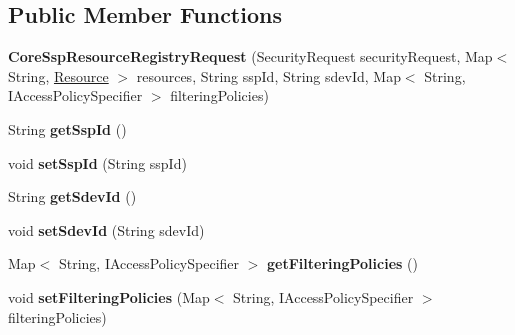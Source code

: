 \subsection*{Public Member Functions}
\begin{DoxyCompactItemize}
\item 
\mbox{\label{classeu_1_1h2020_1_1symbiote_1_1core_1_1internal_1_1CoreSspResourceRegistryRequest_a8bf3bce67d2ac86711298c947b2f7a15}} 
{\bfseries Core\+Ssp\+Resource\+Registry\+Request} (Security\+Request security\+Request, Map$<$ String, \hyperlink{classeu_1_1h2020_1_1symbiote_1_1model_1_1cim_1_1Resource}{Resource} $>$ resources, String ssp\+Id, String sdev\+Id, Map$<$ String, I\+Access\+Policy\+Specifier $>$ filtering\+Policies)
\item 
\mbox{\label{classeu_1_1h2020_1_1symbiote_1_1core_1_1internal_1_1CoreSspResourceRegistryRequest_a09b453f9836eddaf3b2746f798e9b730}} 
String {\bfseries get\+Ssp\+Id} ()
\item 
\mbox{\label{classeu_1_1h2020_1_1symbiote_1_1core_1_1internal_1_1CoreSspResourceRegistryRequest_a867bd2df3f9f47e5140006d5cdbb497e}} 
void {\bfseries set\+Ssp\+Id} (String ssp\+Id)
\item 
\mbox{\label{classeu_1_1h2020_1_1symbiote_1_1core_1_1internal_1_1CoreSspResourceRegistryRequest_a9fb925acbb24d1b4cdfd9c5508bc2549}} 
String {\bfseries get\+Sdev\+Id} ()
\item 
\mbox{\label{classeu_1_1h2020_1_1symbiote_1_1core_1_1internal_1_1CoreSspResourceRegistryRequest_aad9055660a26b8e451b41394d499e7e4}} 
void {\bfseries set\+Sdev\+Id} (String sdev\+Id)
\item 
\mbox{\label{classeu_1_1h2020_1_1symbiote_1_1core_1_1internal_1_1CoreSspResourceRegistryRequest_a2bc94070c9929e4147841f3d13087015}} 
Map$<$ String, I\+Access\+Policy\+Specifier $>$ {\bfseries get\+Filtering\+Policies} ()
\item 
\mbox{\label{classeu_1_1h2020_1_1symbiote_1_1core_1_1internal_1_1CoreSspResourceRegistryRequest_a6575fac93dfb11edf10d92a5122efee7}} 
void {\bfseries set\+Filtering\+Policies} (Map$<$ String, I\+Access\+Policy\+Specifier $>$ filtering\+Policies)
\end{DoxyCompactItemize}


